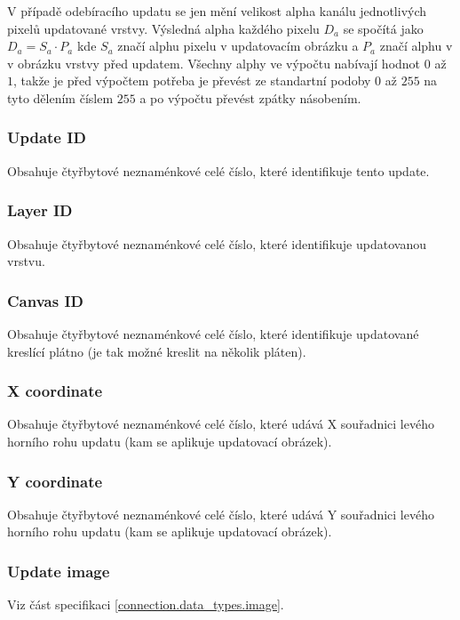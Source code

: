 V případě odebíracího updatu se jen mění velikost alpha kanálu jednotlivých pixelů updatované vrstvy. Výsledná alpha každého pixelu $D_{a}$ se spočítá jako $D_{a} = S_{a} \cdot P_{a}$ kde $S_{a}$ značí alphu pixelu v updatovacím obrázku a $P_{a}$ značí alphu v v obrázku vrstvy před updatem. Všechny alphy ve výpočtu nabívají hodnot $0$ až $1$, takže je před výpočtem potřeba je převést ze standartní podoby $0$ až $255$ na tyto dělením číslem $255$ a po výpočtu převést zpátky násobením.

\subsubsection{Update ID}

Obsahuje čtyřbytové neznaménkové celé číslo, které identifikuje tento update.

\subsubsection{Layer ID}

Obsahuje čtyřbytové neznaménkové celé číslo, které identifikuje updatovanou vrstvu.

\subsubsection{Canvas ID}

Obsahuje čtyřbytové neznaménkové celé číslo, které identifikuje updatované kreslící plátno (je tak možné kreslit na několik pláten).

\subsubsection{X coordinate}

Obsahuje čtyřbytové neznaménkové celé číslo, které udává X souřadnici levého horního rohu updatu (kam se aplikuje updatovací obrázek).

\subsubsection{Y coordinate}

Obsahuje čtyřbytové neznaménkové celé číslo, které udává Y souřadnici levého horního rohu updatu (kam se aplikuje updatovací obrázek).

\subsubsection{Update image}

Viz část specifikaci \ref{connection.data_types.image}.